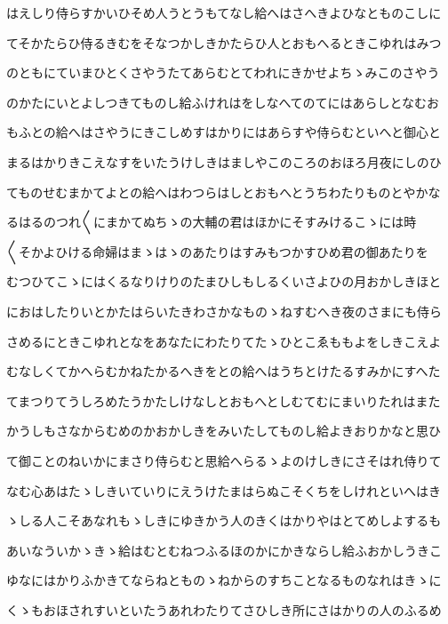 \documentclass[a4paper,11pt,landscape]{ltjtarticle}
\begin{document}
\par\medskip
はえしり侍らすかいひそめ人うとうもてなし給へはさへきよひなとものこしに
\par\medskip
てそかたらひ侍るきむをそなつかしきかたらひ人とおもへるときこゆれはみつ
\par\medskip
のともにていまひとくさやうたてあらむとてわれにきかせよちゝみこのさやう
\par\medskip
のかたにいとよしつきてものし給ふけれはをしなへてのてにはあらしとなむお
\par\medskip
もふとの給へはさやうにきこしめすはかりにはあらすや侍らむといへと御心と
\par\medskip
まるはかりきこえなすをいたうけしきはましやこのころのおほろ月夜にしのひ
\par\medskip
てものせむまかてよとの給へはわつらはしとおもへとうちわたりものとやかな
\par\medskip
るはるのつれ〱にまかてぬちゝの大輔の君はほかにそすみけるこゝには時
\par\medskip
〱そかよひける命婦はまゝはゝのあたりはすみもつかすひめ君の御あたりを
\par\medskip
むつひてこゝにはくるなりけりのたまひしもしるくいさよひの月おかしきほと
\par\medskip
におはしたりいとかたはらいたきわさかなものゝねすむへき夜のさまにも侍ら
\par\medskip
さめるにときこゆれとなをあなたにわたりてたゝひとこゑももよをしきこえよ
\par\medskip
むなしくてかへらむかねたかるへきをとの給へはうちとけたるすみかにすへた
\par\medskip
てまつりてうしろめたうかたしけなしとおもへとしむてむにまいりたれはまた
\par\medskip
かうしもさなからむめのかおかしきをみいたしてものし給よきおりかなと思ひ
\par\medskip
て御ことのねいかにまさり侍らむと思給へらるゝよのけしきにさそはれ侍りて
\par\medskip
なむ心あはたゝしきいていりにえうけたまはらぬこそくちをしけれといへはき
\par\medskip
ゝしる人こそあなれもゝしきにゆきかう人のきくはかりやはとてめしよするも
\par\medskip
あいなういかゝきゝ給はむとむねつふるほのかにかきならし給ふおかしうきこ
\par\medskip
ゆなにはかりふかきてならねとものゝねからのすちことなるものなれはきゝに
\par\medskip
くゝもおほされすいといたうあれわたりてさひしき所にさはかりの人のふるめ
\par\medskip
\end{document}
